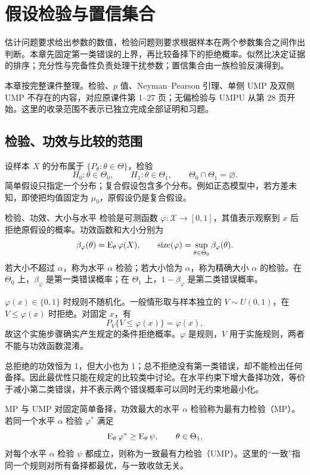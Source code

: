 \chapter{假设检验与置信集合}

估计问题要求给出参数的数值，检验问题则要求根据样本在两个参数集合之间作出判断。本章先固定第一类错误的上界，再比较备择下的拒绝概率。似然比决定证据的排序；充分性与完备性负责处理干扰参数；置信集合由一族检验反演得到。

\begin{notebox}[阅读范围]
本章按完整课件整理。检验、$p$ 值、Neyman--Pearson 引理、单侧 UMP 及双侧 UMP 不存在的内容，对应原课件第 1--27 页；无偏检验与 UMPU 从第 28 页开始。这里的收录范围不表示已独立完成全部证明和习题。
\end{notebox}

\section{检验、功效与比较的范围}

设样本 $X$ 的分布属于 $\{P_\theta:\theta\in\Theta\}$，检验
\[
 H_0:\theta\in\Theta_0,\qquad H_1:\theta\in\Theta_1,
 \qquad \Theta_0\cap\Theta_1=\varnothing.
\]
简单假设只指定一个分布；复合假设包含多个分布。例如正态模型中，若方差未知，即使把均值固定为 $\mu_0$，原假设仍是复合假设。

\begin{definitionbox}{检验、功效、大小与水平}
检验是可测函数 $\varphi:\mathcal X\to[0,1]$，其值表示观察到 $x$ 后拒绝原假设的概率。功效函数和大小分别为
\[
 \beta_\varphi(\theta)=\operatorname{E}_\theta\varphi(X),\qquad
 \operatorname{size}(\varphi)=\sup_{\theta\in\Theta_0}\beta_\varphi(\theta).
\]
若大小不超过 $\alpha$，称为水平 $\alpha$ 检验；若大小恰为 $\alpha$，称为精确大小 $\alpha$ 的检验。在 $\Theta_0$ 上，$\beta_\varphi$ 是第一类错误概率；在 $\Theta_1$ 上，$1-\beta_\varphi$ 是第二类错误概率。
\end{definitionbox}

$\varphi(x)\in\{0,1\}$ 时规则不随机化。一般情形取与样本独立的 $V\sim U(0,1)$，在 $V\le\varphi(x)$ 时拒绝。对固定 $x$，有
\[
 P_V\{V\le\varphi(x)\}=\varphi(x),
\]
故这个实施步骤确实产生规定的条件拒绝概率。$\varphi$ 是规则，$V$ 用于实施规则，两者不能与功效函数混淆。

总拒绝的功效恒为 1，但大小也为 1；总不拒绝没有第一类错误，却不能检出任何备择。因此最优性只能在规定的比较类中讨论。在水平约束下增大备择功效，等价于减小第二类错误，并不表示两个错误概率可以同时无约束地最小化。

\begin{definitionbox}{MP 与 UMP}
对固定简单备择，功效最大的水平 $\alpha$ 检验称为最有力检验（MP）。若同一个水平 $\alpha$ 检验 $\varphi^*$ 满足
\[
 \operatorname{E}_\theta\varphi^*\ge\operatorname{E}_\theta\psi,
 \qquad \theta\in\Theta_1,
\]
对每个水平 $\alpha$ 检验 $\psi$ 都成立，则称为一致最有力检验（UMP）。这里的“一致”指同一个规则对所有备择都最优，与一致收敛无关。
\end{definitionbox}

